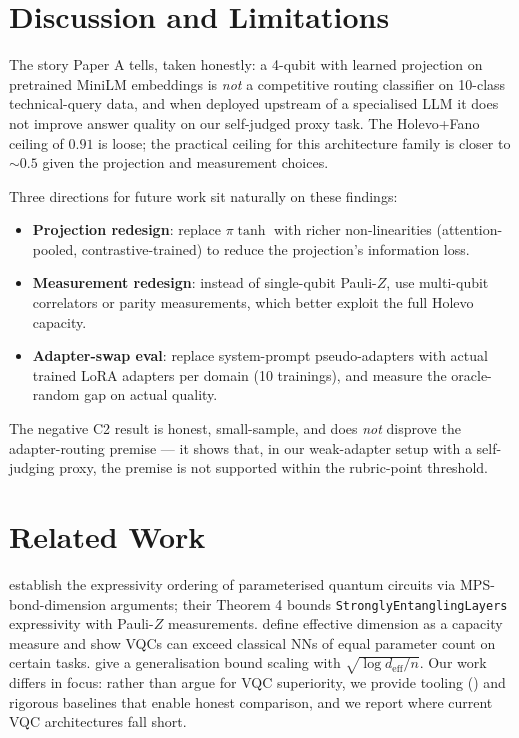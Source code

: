 \section{Discussion and Limitations}

The story Paper A tells, taken honestly: a 4-qubit \vqc{} with learned projection on pretrained MiniLM embeddings is \emph{not} a competitive routing classifier on 10-class technical-query data, and when deployed upstream of a specialised LLM it does not improve answer quality on our self-judged proxy task. The Holevo+Fano ceiling of $0.91$ is loose; the practical ceiling for this architecture family is closer to $\sim 0.5$ given the projection and measurement choices.

Three directions for future work sit naturally on these findings:
\begin{itemize}
\item \textbf{Projection redesign}: replace $\pi \tanh$ with richer non-linearities (attention-pooled, contrastive-trained) to reduce the projection's information loss.
\item \textbf{Measurement redesign}: instead of single-qubit Pauli-$Z$, use multi-qubit correlators or parity measurements, which better exploit the full Holevo capacity.
\item \textbf{Adapter-swap eval}: replace system-prompt pseudo-adapters with actual trained LoRA adapters per domain (10 trainings), and measure the oracle-random gap on actual quality.
\end{itemize}

The negative C2 result is honest, small-sample, and does \emph{not} disprove the adapter-routing premise --- it shows that, in our weak-adapter setup with a self-judging proxy, the premise is not supported within the rubric-point threshold.

\section{Related Work}

\citet{du2020expressive} establish the expressivity ordering of parameterised quantum circuits via MPS-bond-dimension arguments; their Theorem 4 bounds \texttt{StronglyEntanglingLayers} expressivity with Pauli-$Z$ measurements. \citet{abbas2021effective} define effective dimension as a capacity measure and show VQCs can exceed classical NNs of equal parameter count on certain tasks. \citet{caro2022generalization} give a generalisation bound scaling with $\sqrt{\log d_{\mathrm{eff}}/n}$. Our work differs in focus: rather than argue for VQC superiority, we provide tooling (\torchvqc) and rigorous baselines that enable honest comparison, and we report where current VQC architectures fall short.

